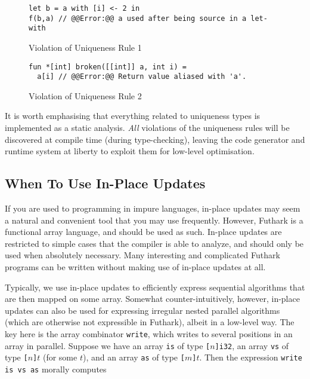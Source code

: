 \documentclass[oneside,11pt]{book}
\begin{document}
\begin{figure}
\centering
\begin{lstlisting}
let b = a with [i] <- 2 in
f(b,a) // @@Error:@@ a used after being source in a let-with
\end{lstlisting}
\caption{Violation of Uniqueness Rule 1}
\label{fig:uniqueness-rule-1-violation}
\end{figure}

\begin{figure}
\centering
\begin{lstlisting}
fun *[int] broken([[int]] a, int i) =
  a[i] // @@Error:@@ Return value aliased with 'a'.
\end{lstlisting}
\caption{Violation of Uniqueness Rule 2}
\label{fig:uniqueness-rule-2-violation}
\end{figure}

It is worth emphasising that everything related to uniqueness types is
implemented as a static analysis.  \textit{All} violations of the
uniqueness rules will be discovered at compile time (during
type-checking), leaving the code generator and runtime system at
liberty to exploit them for low-level optimisation.

\subsection{When To Use In-Place Updates}

If you are used to programming in impure languages, in-place updates
may seem a natural and convenient tool that you may use frequently.
However, Futhark is a functional array language, and should be used as
such.  In-place updates are restricted to simple cases that the
compiler is able to analyze, and should only be used when absolutely
necessary.  Many interesting and complicated Futhark programs can be
written without making use of in-place updates at all.

Typically, we use in-place updates to efficiently express sequential
algorithms that are then mapped on some array.  Somewhat
counter-intuitively, however, in-place updates can also be used for
expressing irregular nested parallel algorithms (which are otherwise
not expressible in Futhark), albeit in a low-level way.  The key here
is the array combinator \texttt{write}, which writes to several
positions in an array in parallel.  Suppose we have an array
\texttt{is} of type \texttt{[$n$]i32}, an array \texttt{vs} of type
\texttt{[$n$]$t$} (for some \texttt{$t$}), and an array \texttt{as}
of type \texttt{[$m$]$t$}. Then the expression \texttt{write is vs
  as} morally computes
\end{document}
